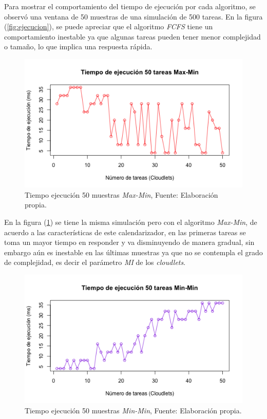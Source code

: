 Para mostrar el comportamiento del tiempo de ejecuci\'on por cada algoritmo, se observó una ventana de 50 muestras de una simulaci\'on de 500 tareas. En la figura (\ref{fig:ejecucion}), se puede apreciar que el algoritmo \textit{FCFS} tiene un comportamiento inestable ya que algunas tareas pueden tener menor complejidad o tamaño, lo que implica una respuesta r\'apida.

\newpage

\renewcommand\thefigure{\arabic{figure}}
\begin{figure}[h!] 
	\centering
	\includegraphics[scale=0.6]{media/maxmin}
	\caption{Tiempo ejecuci\'on 50 muestras \textit{Max-Min}, Fuente: Elaboraci\'on propia.}
	\label{fig:maxmin}
\end{figure}


 En la figura (\ref{fig:maxmin}) se tiene la misma simulaci\'on pero con el algoritmo \textit{Max-Min}, de acuerdo a las caracter\'isticas de este calendarizador, en las primeras tareas se toma un mayor tiempo en responder y va disminuyendo de manera gradual, sin embargo a\'un es inestable en las \'ultimas muestras ya que no se contempla el grado de complejidad, es decir el par\'ametro \textit{MI} de los \textit{cloudlets}.



\newpage

\renewcommand\thefigure{\arabic{figure}}
\begin{figure}[h!] 
	\centering
	\includegraphics[scale=0.6]{media/minmin}
	\caption{Tiempo ejecuci\'on 50 muestras \textit{Min-Min}, Fuente: Elaboraci\'on propia.}
	\label{fig:minmin}
\end{figure}

